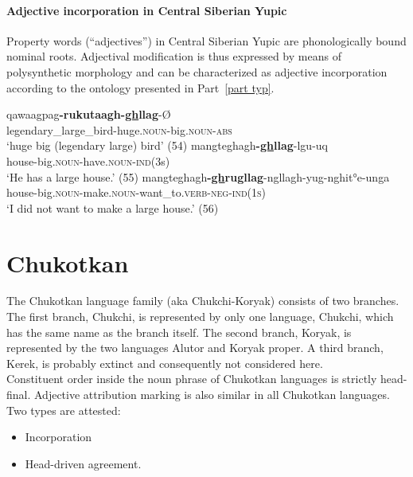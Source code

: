 \paragraph{Adjective incorporation in Central Siberian Yupic}
Property words (“adjectives”) in Central Siberian Yupic are phonologically bound nominal roots. Adjectival modification is thus expressed by means of polysynthetic morphology and can be characterized as adjective incorporation according to the ontology presented in Part~\ref{part typ}.
\begin{exe}
\ex {}
\begin{xlist}
\ex
\gll	qawaagpag\textbf{-rukutaagh-\underline{gh}llag}-Ø\\
	legendary\_large\_bird-huge.\textsc{noun}-big.\textsc{noun}-\textsc{abs}\\
\glt	‘huge big (legendary large) bird’ (54)
\ex	
\gll	mangteghagh\textbf{-\underline{gh}llag}-lgu-uq\\
	house-big.\textsc{noun}-have.\textsc{noun}-\textsc{ind}(3s)\\
\glt	‘He has a large house.’ (55)
\ex	
\gll	mangteghagh\textbf{-\underline{gh}rugllag}-ngllagh-yug-nghit°e-unga\\
	house-big.\textsc{noun}-make.\textsc{noun}-want\_to.\textsc{verb}-\textsc{neg}-\textsc{ind(1s)}\\
\glt	‘I did not want to make a large house.’ (56)
\end{xlist}
\end{exe}

\section{Chukotkan}
The Chukotkan language family (aka Chukchi-Koryak) consists of two branches. The first branch, Chukchi, is represented by only one language, Chukchi, which has the same name as the branch itself. The second branch, Koryak, is represented by the two languages Alutor and Koryak proper. A third branch, Kerek, is probably extinct \cite[253]{salminen2007} and consequently not considered here.\\

\noindent Constituent order inside the noun phrase of Chukotkan languages is strictly head-final. Adjective attribution marking is also similar in all Chukotkan languages. Two types are attested:
\begin{itemize}
\item Incorporation
\item Head-driven agreement.
\end{itemize}

